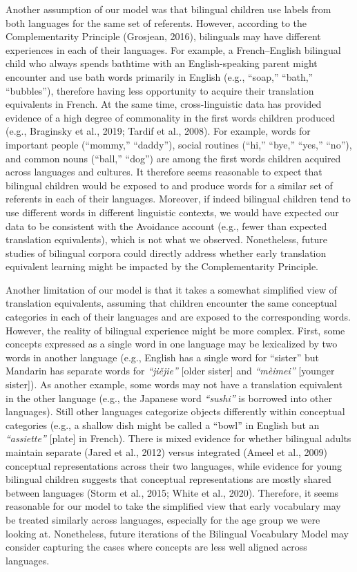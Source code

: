 \documentclass[
  english,
  ,man,floatsintext]{apa6}
\begin{document}
Another assumption of our model was that bilingual children use labels from both languages for the same set of referents. However, according to the Complementarity Principle (Grosjean, 2016), bilinguals may have different experiences in each of their languages. For example, a French--English bilingual child who always spends bathtime with an English-speaking parent might encounter and use bath words primarily in English (e.g., ``soap,'' ``bath,'' ``bubbles''), therefore having less opportunity to acquire their translation equivalents in French. At the same time, cross-linguistic data has provided evidence of a high degree of commonality in the first words children produced (e.g., Braginsky et al., 2019; Tardif et al., 2008). For example, words for important people (``mommy,'' ``daddy''), social routines (``hi,'' ``bye,'' ``yes,'' ``no''), and common nouns (``ball,'' ``dog'') are among the first words children acquired across languages and cultures. It therefore seems reasonable to expect that bilingual children would be exposed to and produce words for a similar set of referents in each of their languages. Moreover, if indeed bilingual children tend to use different words in different linguistic contexts, we would have expected our data to be consistent with the Avoidance account (e.g., fewer than expected translation equivalents), which is not what we observed. Nonetheless, future studies of bilingual corpora could directly address whether early translation equivalent learning might be impacted by the Complementarity Principle.

Another limitation of our model is that it takes a somewhat simplified view of translation equivalents, assuming that children encounter the same conceptual categories in each of their languages and are exposed to the corresponding words. However, the reality of bilingual experience might be more complex. First, some concepts expressed as a single word in one language may be lexicalized by two words in another language (e.g., English has a single word for ``sister'' but Mandarin has separate words for \emph{``jiějie''} {[}older sister{]} and \emph{``mèimei''} {[}younger sister{]}). As another example, some words may not have a translation equivalent in the other language (e.g., the Japanese word \emph{``sushi''} is borrowed into other languages). Still other languages categorize objects differently within conceptual categories (e.g., a shallow dish might be called a ``bowl'' in English but an \emph{``assiette''} {[}plate{]} in French). There is mixed evidence for whether bilingual adults maintain separate (Jared et al., 2012) versus integrated (Ameel et al., 2009) conceptual representations across their two languages, while evidence for young bilingual children suggests that conceptual representations are mostly shared between languages (Storm et al., 2015; White et al., 2020). Therefore, it seems reasonable for our model to take the simplified view that early vocabulary may be treated similarly across languages, especially for the age group we were looking at. Nonetheless, future iterations of the Bilingual Vocabulary Model may consider capturing the cases where concepts are less well aligned across languages.
\end{document}
